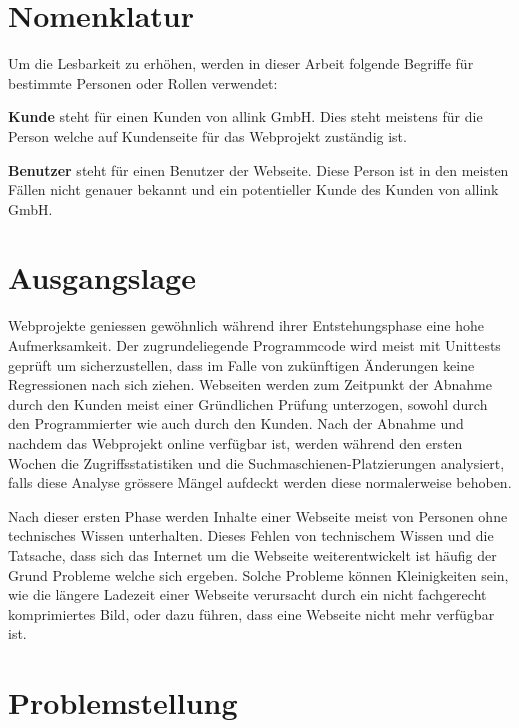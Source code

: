 
\section{Nomenklatur}
\label{sec:nomenklatur}

Um die Lesbarkeit zu erhöhen, werden in dieser Arbeit folgende Begriffe für bestimmte Personen oder Rollen verwendet:

{\bf Kunde} steht für einen Kunden von allink GmbH. Dies steht meistens für die Person welche auf Kundenseite für das Webprojekt zuständig ist.

{\bf Benutzer} steht für einen Benutzer der Webseite. Diese Person ist in den meisten Fällen nicht genauer bekannt und ein potentieller Kunde des Kunden von allink GmbH.

\section{Ausgangslage}
\label{sec:ausgangslage}

Webprojekte geniessen gewöhnlich während ihrer Entstehungsphase eine hohe Aufmerksamkeit. Der zugrundeliegende Programmcode wird meist mit Unittests geprüft um sicherzustellen, dass im Falle von zukünftigen Änderungen keine Regressionen nach sich ziehen. Webseiten werden zum Zeitpunkt der Abnahme durch den Kunden meist einer Gründlichen Prüfung unterzogen, sowohl durch den Programmierter wie auch durch den Kunden. Nach der Abnahme und nachdem das Webprojekt online verfügbar ist, werden während den ersten Wochen die Zugriffsstatistiken und die Suchmaschienen-Platzierungen analysiert, falls diese Analyse grössere Mängel aufdeckt werden diese normalerweise behoben.

Nach dieser ersten Phase werden Inhalte einer Webseite meist von Personen ohne technisches Wissen unterhalten. Dieses Fehlen von technischem Wissen und die Tatsache, dass sich das Internet um die Webseite weiterentwickelt ist häufig der Grund Probleme welche sich ergeben. Solche Probleme können Kleinigkeiten sein, wie die längere Ladezeit einer Webseite verursacht durch ein nicht fachgerecht komprimiertes Bild, oder dazu führen, dass eine Webseite nicht mehr verfügbar ist.

\section{Problemstellung}
\label{sec:problemstellung}

